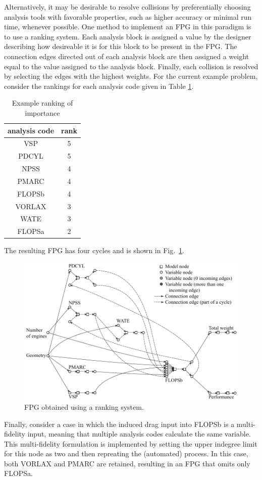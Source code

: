 	Alternatively, it may be desirable to resolve collisions by preferentially choosing analysis tools with favorable properties, such as higher accuracy or minimal run time, whenever possible.
	One method to implement an FPG in this paradigm is to use a ranking system. Each analysis block is assigned a value by the designer describing how desireable it is for this block to be present in the FPG. The connection edges directed out of each analysis block are then assigned a weight equal to the value assigned to the analysis block. Finally, each collision is resolved by selecting the edges with the highest weights.
For the current example problem, consider the rankings for each analysis code given in Table \ref{t:rankings}.
	\begin{table}[htbp]
	  \centering
	  \caption{Example ranking of importance}
		\begin{tabular}{cc}
		\toprule
		analysis code & rank \\
		\midrule
		VSP   & 5 \\
		PDCYL & 5 \\
		NPSS  & 4 \\
		PMARC & 4 \\
		FLOPSb & 4 \\
		VORLAX & 3 \\
		WATE  & 3 \\
		FLOPSa & 2 \\
		\bottomrule
		\end{tabular}%
	  \label{t:rankings}%
	\end{table}%
	The resulting FPG has four cycles and is shown in Fig.~\ref{f:FPG highest rank}. 
	\begin{figure}[htb!]
	  \begin{center}
		\includegraphics[width=6in]{images/FPG_edit_ranking}
	  \end{center}
	  \caption{FPG obtained using a ranking system.}
	\label{f:FPG highest rank}
	\end{figure}

	Finally, consider a case in which 
the induced drag input into FLOPSb is a multi-fidelity input, meaning that 
 multiple analysis codes calculate the same variable. 
	This multi-fidelity formulation is implemented by setting the upper indegree limit for this node as two and then repreating the (automated) process. 
	In this case, both VORLAX and PMARC are retained, resulting in an FPG that omits only FLOPSa.

